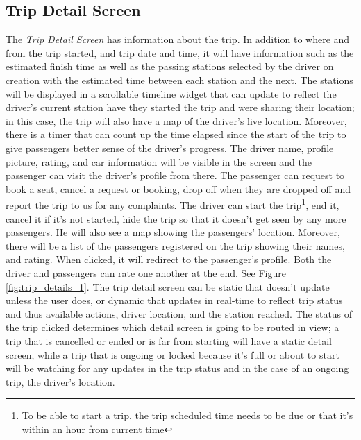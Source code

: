 \documentclass[a4paper, 12pt]{report} %
\begin{document}
        \subsection{Trip Detail Screen}
            The \textit{Trip Detail Screen} has information about the trip. In addition to where and from the trip started, and trip date and time, it will have information such as the estimated finish time as well as the passing stations selected by the driver on creation with the estimated time between each station and the next. The stations will be displayed in a scrollable timeline widget that can update to reflect the driver's current station have they started the trip and were sharing their location; in this case, the trip will also have a map of the driver's live location. Moreover, there is a timer that can count up the time elapsed since the start of the trip to give passengers better sense of the driver's progress. The driver name, profile picture, rating, and car information will be visible in the screen and the passenger can visit the driver's profile from there. The passenger can request to book a seat, cancel a request or booking, drop off when they are dropped off and report the trip to us for any complaints. The driver can start the trip\footnote{To be able to start a trip, the trip scheduled time needs to be due or that it's within an hour from current time}, end it, cancel it if it's not started, hide the trip so that it doesn't get seen by any more passengers. He will also see a map showing the passengers' location. Moreover, there will be a list of the passengers registered on the trip showing their names, and rating. When clicked, it will redirect to the passenger's profile. Both the driver and passengers can rate one another at the end. See Figure \ref{fig:trip_details_1}. The trip detail screen can be static that doesn't update unless the user does, or dynamic that updates in real-time to reflect trip status and thus available actions, driver location, and the station reached. The status of the trip clicked determines which detail screen is going to be routed in view; a trip that is cancelled or ended or is far from starting will have a static detail screen, while a trip that is ongoing or locked because it's full or about to start will be watching for any updates in the trip status and in the case of an ongoing trip, the driver's location.
\end{document}

